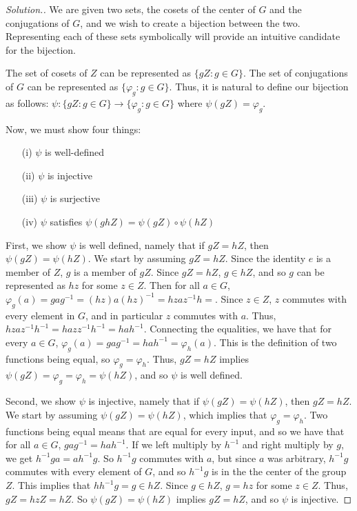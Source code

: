 \documentclass{article}
\newcommand{\sk}{\smallskip}
\begin{document}
\begin{enumerate}
    \begin{proof}[Solution.]
        We are given two sets, the cosets of the center of $G$ and the conjugations of $G$, and we wish to create a bijection between the two. Representing each of these sets symbolically will provide an intuitive candidate for the bijection. 

        \sk

        The set of cosets of $Z$ can be represented as $\{gZ : g \in G\}$. The set of conjugations of $G$ can be represented as $\{\varphi_g : g \in G\}$. Thus, it is natural to define our bijection as follows: $\psi: \{gZ : g \in G\} \rightarrow \{\varphi_g : g \in G\}$ where $\psi(gZ) = \varphi_g$.

        \sk

        Now, we must show four things:
        \begin{enumerate}
            \item[(i)] $\psi$ is well-defined
            \item[(ii)] $\psi$ is injective
            \item[(iii)] $\psi$ is surjective
            \item[(iv)] $\psi$ satisfies $\psi(ghZ) = \psi(gZ) \circ \psi(hZ)$
        \end{enumerate}

        \sk

        First, we show $\psi$ is well defined, namely that if $gZ = hZ$, then $\psi(gZ) = \psi(hZ)$. We start by assuming $gZ = hZ$. Since the identity $e$ is a member of $Z$, $g$ is a member of $gZ$. Since $gZ = hZ$, $g \in hZ$, and so $g$ can be represented as $hz$ for some $z \in Z$. Then for all $a \in G$, $\varphi_g(a) = gag^{-1} = (hz)a(hz)^{-1} = hzaz^{-1}h=$. Since $z \in Z$, $z$ commutes with every element in $G$, and in particular $z$ commutes with $a$. Thus, $hzaz^{-1}h^{-1} = hazz^{-1}h^{-1} = hah^{-1}$. Connecting the equalities, we have that for every $a \in G$, $\varphi_g(a) = gag^{-1} = hah^{-1} = \varphi_h(a)$. This is the definition of two functions being equal, so $\varphi_g = \varphi_h$. Thus, $gZ = hZ$ implies $\psi(gZ) = \varphi_g = \varphi_h = \psi(hZ)$, and so $\psi$ is well defined. 

        \sk

        Second, we show $\psi$ is injective, namely that if $\psi(gZ) = \psi(hZ)$, then $gZ = hZ$. We start by assuming $\psi(gZ) = \psi(hZ)$, which implies that $\varphi_g = \varphi_h$. Two functions being equal means that are equal for every input, and so we have that for all $a \in G$, $gag^{-1} = hah^{-1}$. If we left multiply by $h^{-1}$ and right multiply by $g$, we get $h^{-1}ga = ah^{-1}g$. So $h^{-1}g$ commutes with $a$, but since $a$ was arbitrary, $h^{-1}g$ commutes with every element of $G$, and so $h^{-1}g$ is in the the center of the group $Z$. This implies that $hh^{-1}g = g \in hZ$. Since $g \in hZ$, $g = hz$ for some $z \in Z$. Thus, $gZ = hzZ = hZ$. So $\psi(gZ) = \psi(hZ)$ implies $gZ = hZ$, and so $\psi$ is injective.


\end{proof}
\end{enumerate}
\end{document}
